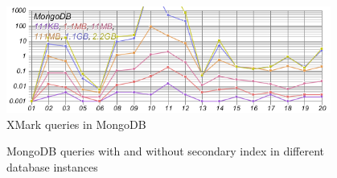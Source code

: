 \begin{figure}
	\centering
	\includegraphics[width=0.95\textwidth]{img/result/mongodb/mongodb-all}
	\caption{XMark queries in MongoDB}
	\label{fig:xmark-result-mongodb-all}
	
\end{figure}	
\begin{figure}
	\centering
	\centering
	\caption{MongoDB queries with and without secondary index in different database instances}
	\label{fig:xmark-mongodb-index-noindex}
\end{figure}

